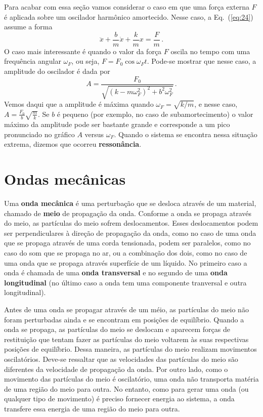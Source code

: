 \documentclass[12pt,a4paper]{article}
\theoremstyle{definition}
\begin{document}
Para acabar com essa seção vamos considerar o caso em que uma força
externa $F$ é aplicada sobre um oscilador harmônico amortecido. Nesse
caso, a Eq.~(\ref{eq:24}) assume a forma
$$\ddot x+\frac{b}{m}\dot x+\frac{k}{m}x=\frac{F}{m}\,.$$
O caso mais interessante é quando o valor da força $F$ oscila no tempo
com uma frequência angular $\omega_F$, ou seja,
$F=F_0\cos\omega_Ft$. Pode-se mostrar que nesse caso, a amplitude do
oscilador é dada por
$$A=\frac{F_0}{\sqrt{(k-m\omega_F^2)^2+b^2\omega_F^2}}\,.$$
Vemos daqui que a amplitude é máxima quando $\omega_F=\sqrt{k/m}$, e
nesse caso, $A=\frac{F_0}{b}\sqrt{\frac{m}{k}}$. Se $b$ é pequeno (por
exemplo, no caso de subamortecimento) o valor máximo da amplitude pode
ser bastante grande e corresponde a um pico pronunciado no gráfico $A$
versus $\omega_F$. Quando o sistema se encontra nessa situação
extrema, dizemos que ocorreu \textbf{ressonância}.

\section{Ondas mecânicas}

Uma \textbf{onda mecânica} é uma perturbação que se desloca através de
um material, chamado de \textbf{meio} de propagação da onda. Conforme
a onda se propaga através do meio, as partículas do meio sofrem
deslocamentos. Esses deslocamentos podem ser perpendiculares à direção
de propagação da onda, como no caso de uma onda que se propaga através
de uma corda tensionada, podem ser paralelos, como no caso do som que
se propaga no ar, ou a combinação dos dois, como no caso de uma onda
que se propaga através superfície de um líquido. No primeiro caso a
onda é chamada de uma \textbf{onda transversal} e no segundo de uma
\textbf{onda longitudinal} (no último caso a onda tem uma componente
tranversal e outra longitudinal).

Antes de uma onda se propagar através de um méio, as partículas do
meio não foram perturbadas ainda e se encontram em posições de
equilíbrio. Quando a onda se propaga, as partículas do meio se
deslocam e aparecem forças de restituição que tentam fazer as
partículas do meio voltarem às suas respectivas posições de
equilíbrio. Dessa maneira, as partículas do meio realizam movimentos
oscilatórios. Deve-se ressaltar que as velocidades das partículas do
meio são diferentes da velocidade de propagação da onda. Por outro
lado, como o movimento das partículas do meio é oscilatório, uma onda
não transporta matéria de uma região do meio para outra. No entanto,
como para gerar uma onda (ou qualquer tipo de movimento) é preciso
fornecer energia ao sistema, a onda transfere essa energia de uma
região do meio para outra.
\end{document}
